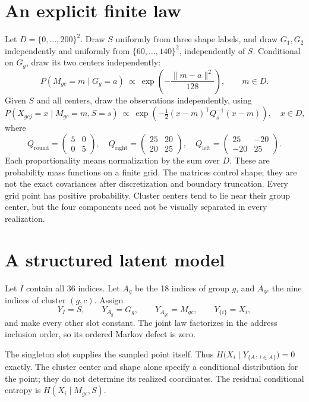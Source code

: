 \documentclass[11pt]{article}
\begin{document}
\newpage
\section{An explicit finite law}
Let $D=\{0,\ldots,200\}^2$. Draw $S$ uniformly from three shape labels, and
draw $G_1,G_2$ independently and uniformly from $\{60,\ldots,140\}^2$,
independently of $S$. Conditional on $G_g$, draw its two centers independently:
\[
 P(M_{gc}=m\mid G_g=a)\ \propto\
 \exp\!\left(-\frac{\|m-a\|^2}{128}\right),\qquad m\in D.
\]
Given $S$ and all centers, draw the observations independently, using
\[
 P(X_{gcj}=x\mid M_{gc}=m,S=s)\ \propto\
 \exp\!\left(-\tfrac12(x-m)^\mathsf{T}Q_s^{-1}(x-m)\right),\quad x\in D,
\]
where
\[
 Q_{\mathrm{round}}=\begin{pmatrix}5&0\\0&5\end{pmatrix},\quad
 Q_{\mathrm{right}}=\begin{pmatrix}25&20\\20&25\end{pmatrix},\quad
 Q_{\mathrm{left}}=\begin{pmatrix}25&-20\\-20&25\end{pmatrix}.
\]
Each proportionality means normalization by the sum over $D$. These are
probability mass functions on a finite grid. The matrices control shape; they
are not the exact covariances after discretization and boundary truncation.
Every grid point has positive probability. Cluster centers tend to lie near
their group center, but the four components need not be visually separated in
every realization.

\section{A structured latent model}
Let $I$ contain all 36 indices. Let $A_g$ be the 18 indices of group $g$, and
$A_{gc}$ the nine indices of cluster $(g,c)$. Assign
\[
 Y_I=S,\qquad Y_{A_g}=G_g,\qquad Y_{A_{gc}}=M_{gc},\qquad
 Y_{\{i\}}=X_i,
\]
and make every other slot constant. The joint law factorizes in the address
inclusion order, so its ordered Markov defect is zero.

The singleton slot supplies the sampled point itself. Thus
$H\bigl(X_i\mid Y_{\{A\,:\,i\in A\}}\bigr)=0$ exactly. The cluster center and shape alone
specify a conditional distribution for the point; they do not determine its
realized coordinates. The residual conditional entropy is
$H(X_i\mid M_{gc},S)$.
\end{document}
